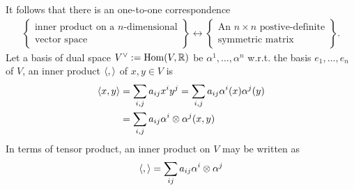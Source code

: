 It follows that there is an one-to-one correspondence
\begin{align}
    \left\{
    \begin{array}{c}
        \text{inner product on a $n$-dimensional} \\
        \text{vector space}
    \end{array}
\right\}
\leftrightarrow
\left\{
    \begin{array}{c}
        \text{An $n \times n$ postive-definite} \\
        \text{symmetric matrix}
    \end{array}
\right\}.
\end{align}
Let a basis of dual space $V^\vee:=\mathrm{Hom}(V, {\mathbb{R}})$ be $\alpha^1,\dots,\alpha^n$ w.r.t.
the basis $e_1,\dots,e_n$ of $V$, an inner product $\langle ,  \rangle$ of $x,y\in V$ is
\begin{align}
    \langle x, y \rangle&=\sum_{i,j} a_{ij} x^i y^j=\sum_{i,j} a_{ij} \alpha^i(x) \alpha^j(y) \nonumber \\
    &=\sum_{i,j} a_{ij} \alpha^i \otimes \alpha^j (x,y) \nonumber
\end{align}
In terms of tensor product, an inner product on $V$ may be written as
\begin{align}
    \langle ,  \rangle = \sum_{ij}a_{ij} \alpha^i \otimes \alpha^j
\end{align}

